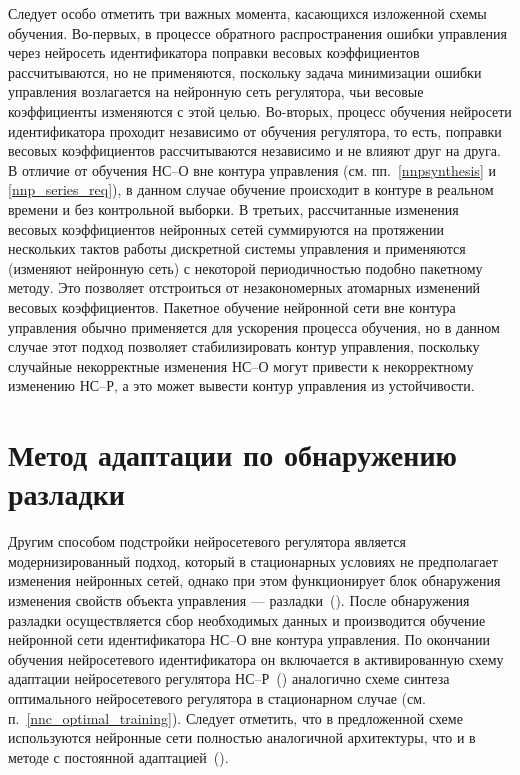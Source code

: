 Следует особо отметить три важных момента, касающихся изложенной схемы
обучения.  Во-первых, в процессе обратного распространения ошибки
управления через нейросеть идентификатора поправки весовых
коэффициентов рассчитываются, но не применяются, поскольку задача
минимизации ошибки управления возлагается на нейронную сеть
регулятора, чьи весовые коэффициенты изменяются с этой целью.
Во-вторых, процесс обучения нейросети идентификатора проходит
независимо от обучения регулятора, то есть, поправки весовых
коэффициентов рассчитываются независимо и не влияют друг на друга.  В
отличие от обучения НС--О вне контура управления
(см. пп.~\ref{nnpsynthesis} и \ref{nnp_series_req}), в данном случае
обучение происходит в контуре в реальном времени и без контрольной
выборки.  В третьих, рассчитанные изменения весовых коэффициентов
нейронных сетей суммируются на протяжении нескольких тактов работы
дискретной системы управления и применяются (изменяют нейронную сеть)
с некоторой периодичностью подобно пакетному методу.  Это позволяет
отстроиться от незакономерных атомарных изменений весовых
коэффициентов.  Пакетное обучение нейронной сети вне контура
управления обычно применяется для ускорения процесса обучения, но в
данном случае этот подход позволяет стабилизировать контур управления,
поскольку случайные некорректные изменения НС--О могут привести к
некорректному изменению НС--Р, а это может вывести контур управления
из устойчивости.

\section{Метод адаптации по обнаружению разладки}

Другим способом подстройки нейросетевого регулятора является
модернизированный подход, который в стационарных условиях не
предполагает изменения нейронных сетей, однако при этом функционирует
блок обнаружения изменения свойств объекта управления ---
разладки~().  После обнаружения разладки
осуществляется сбор необходимых данных и производится обучение
нейронной сети идентификатора НС--О вне контура управления.  По
окончании обучения нейросетевого идентификатора он включается в
активированную схему адаптации нейросетевого регулятора
НС--Р~() аналогично схеме синтеза
оптимального нейросетевого регулятора в стационарном случае
(см. п.~\ref{nnc_optimal_training}).  Следует отметить, что в
предложенной схеме используются нейронные сети полностью аналогичной
архитектуры, что и в методе с постоянной
адаптацией~().

